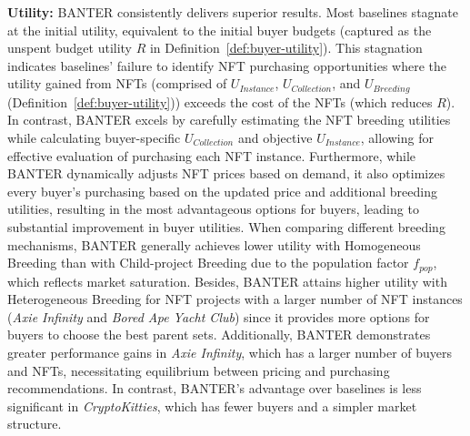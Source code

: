 \documentclass[conference]{IEEEtran}
\theoremstyle{plain}
\begin{document}
\noindent\textbf{Utility:} BANTER\xspace consistently delivers superior results. Most baselines stagnate at the initial utility, equivalent to the initial buyer budgets (captured as the unspent budget utility $R$ in Definition~\ref{def:buyer-utility}). This stagnation indicates baselines' failure to identify NFT purchasing opportunities where the utility gained from NFTs (comprised of $U_\textit{Instance}$, $U_\textit{Collection}$, and $U_\textit{Breeding}$ (Definition~\ref{def:buyer-utility})) exceeds the cost of the NFTs (which reduces $R$). In contrast, BANTER\xspace excels by carefully estimating the NFT breeding utilities while calculating buyer-specific $U_\textit{Collection}$ and objective $U_\textit{Instance}$, allowing for effective evaluation of purchasing each NFT instance. Furthermore, while BANTER\xspace dynamically adjusts NFT prices based on demand, it also optimizes every buyer's purchasing based on the updated price and additional breeding utilities, resulting in the most advantageous options for buyers, leading to substantial improvement in buyer utilities. When comparing different breeding mechanisms, BANTER\xspace generally achieves lower utility with Homogeneous Breeding\xspace than with Child-project Breeding\xspace due to the population factor $f_{pop}$, which reflects market saturation. Besides, BANTER\xspace attains higher utility with Heterogeneous Breeding\xspace for NFT projects with a larger number of NFT instances (\textit{Axie Infinity} and \textit{Bored Ape Yacht Club}) since it provides more options for buyers to choose the best parent sets. Additionally, BANTER\xspace demonstrates greater performance gains in \textit{Axie Infinity}, which has a larger number of buyers and NFTs, necessitating equilibrium between pricing and purchasing recommendations. In contrast, BANTER\xspace's advantage over baselines is less significant in \textit{CryptoKitties}, which has fewer buyers and a simpler market structure.
\end{document}
